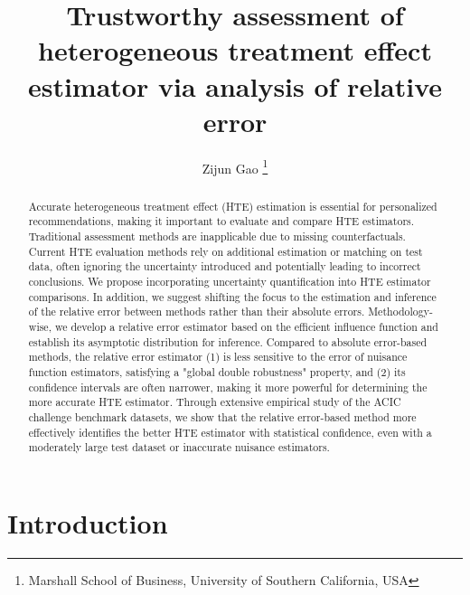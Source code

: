 \documentclass{article}
\title{Trustworthy assessment of heterogeneous treatment effect estimator via analysis of relative error}
\author{
Zijun Gao
  \footnote{\small Marshall School of Business, University of Southern California, USA}
}
\theoremstyle{plain}
\theoremstyle{definition}
\theoremstyle{plain}
\begin{document}
\maketitle


\begin{abstract}
    Accurate heterogeneous treatment effect (HTE) estimation is essential for personalized recommendations, making it important to evaluate and compare HTE estimators. Traditional assessment methods are inapplicable due to missing counterfactuals.
    Current HTE evaluation methods rely on additional estimation or matching on test data, often ignoring the uncertainty introduced and potentially leading to incorrect conclusions. 
    We propose incorporating uncertainty quantification into HTE estimator comparisons.
    In addition, we suggest shifting the focus to the estimation and inference of the relative error between methods rather than their absolute errors.
    Methodology-wise, we develop a relative error estimator based on the efficient influence function and establish its asymptotic distribution for inference. Compared to absolute error-based methods, the relative error estimator (1) is less sensitive to the error of nuisance function estimators, satisfying a "global double robustness" property, and (2) its confidence intervals are often narrower, making it more powerful for determining the more accurate HTE estimator. 
    Through extensive empirical study of the ACIC challenge benchmark datasets, we show that the relative error-based method more effectively identifies the better HTE estimator with statistical confidence, even with a moderately large test dataset or inaccurate nuisance estimators.
\end{abstract}


\section{Introduction}\label{sec:introduction}
\end{document}

